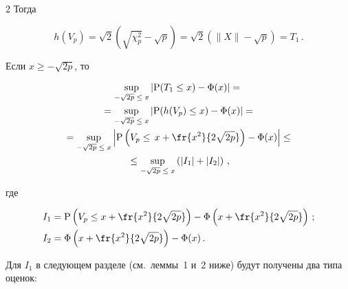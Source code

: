\begin{multicols}{2}
Тогда

\begin{equation*}

 h(V_p)=\sqrt{2}\left(\sqrt{\chi_p^2}- \sqrt{p}\right)

       =\sqrt{2}\left(\|X\|- \sqrt{p}\right)

       =T_1\,.

\end{equation*}

Если   $x \ge -\sqrt{2p}$,    то



\vspace*{-1pt}



\noindent

\begin{multline*}

\sup\limits_{-\sqrt{2p}\; \le\; x} \left |\P(T_1 \le x) - \IP(x) \right|={}\\

{}  =\sup\limits_{-\sqrt{2p}\; \le\; x} \left| \P(h(V_p) \le x) - \IP(x)\right| ={}\\

{}=\sup\limits_{-\sqrt{2p} \;\le\;

 x} \left| \P\left(V_p \le\, x + \fr{x^2}{2\sqrt{2p}}\right) - \IP(x)\right|\leq{}\\

{} \leq\sup\limits_{-\sqrt{2p}\; \le\; x} \left(\left|I_1\right| +\left|I_2 \right|\right)\,,

\end{multline*}

где

\vspace*{-4pt}



\noindent

\begin{align*}

                 I_1&= \P\left(V_p  \le x + \fr{x^2}{2\sqrt{2p}}\right)

         - \IP \left(x + \fr{x^2}{2\sqrt{2p}}\right)\,;\\

                 I_2&= \IP \left(x + \fr{x^2}{2\sqrt{2p}}\right)

             - \IP(x) \,.

\end{align*}

Для  $I_1$   в следующем разделе (см.\ леммы~1 и~2 ниже) будут получены два типа оценок:




\end{multicols}
